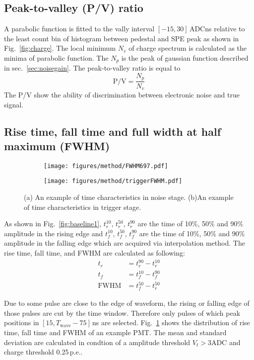 \subsection{Peak-to-valley (P/V) ratio}
A parabolic function is fitted to the vally interval $[-15, 30]$\,ADCns relative to the least count bin of histogram between pedestal and SPE peak as shown in Fig.~\ref{fig:charge}. The local minimum $N_v$ of charge spectrum is calculated as the minima of parabolic function. The $N_p$ is the peak of gaussian function described in sec.~\ref{sec:noisegain}. The peak-to-valley ratio is equal to  
\begin{equation}
    \mathrm{P/V}=\frac{N_p}{N_v}
\end{equation}
The P/V show the ability of discrimination between electronic noise and true signal.
\subsection{Rise time, fall time and full width at half maximum (FWHM)}
\begin{figure}[!htbp]
    \centering
    \begin{subfigure}[t]{0.49\textwidth}
        \texttt{[image: figures/method/FWHM697.pdf]}
        \caption{}
        \label{fig:risefallFWHM}
    \end{subfigure}
    \begin{subfigure}[t]{0.49\textwidth}
        \texttt{[image: figures/method/triggerFWHM.pdf]}
        \caption{}
        \label{fig:triggerFWHM}
    \end{subfigure}
    \caption{(a) An example of time characteristics in noise stage. (b)An example of time characteristics in trigger stage.}
\end{figure}
As shown in Fig.~\ref{fig:baseline1}, $t^{10}_r$, $t^{50}_r$, $t^{90}_r$ are the time of 10\%, 50\% and 90\% amplitude in the rising edge and $t^{10}_f$, $t^{50}_f$, $t^{90}_f$ are the time of 10\%, 50\% and 90\% amplitude in the falling edge which are acquired via interpolation method. The rise time, fall time, and FWHM are calculated as following:
\begin{align}
    t_r &= t^{90}_r - t^{10}_r\\
    t_f &= t^{10}_f - t^{90}_f\\
    \mathrm{FWHM} &= t^{50}_f - t^{50}_r
\end{align}

Due to some pulse are close to the edge of waveform, the rising or falling edge of those pulses are cut by the time window. Therefore only pulses of which peak positions in $[15, T_{\mathrm{wave}}-75]$\,ns are selected. Fig.~\ref{fig:risefallFWHM} shows the distribution of rise time, fall time and FWHM of an example PMT. The mean and standard deviation are calculated in condtion of a amplitude threshold $V_{t}>3\mathrm{ADC}$ and charge threshold 0.25\,p.e..

